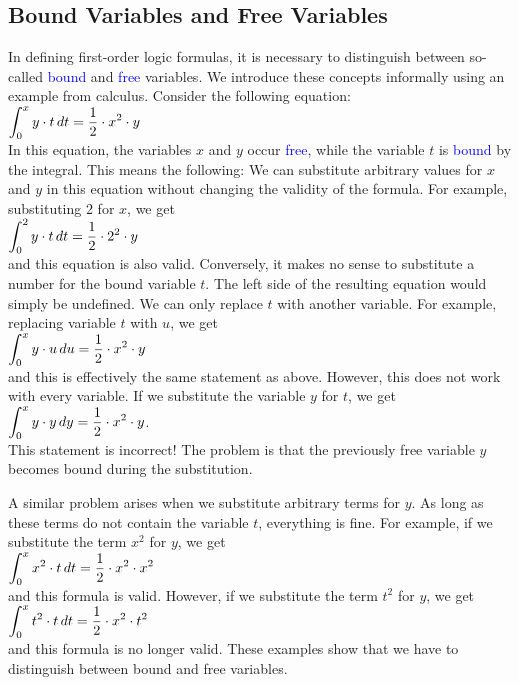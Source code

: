 \subsection{Bound Variables and Free Variables}
In defining first-order logic formulas, it is necessary
to distinguish between so-called \textcolor{blue}{bound} and \textcolor{blue}{free}
variables.
We introduce these concepts informally using an example from calculus.
Consider the following equation: \\[0.2cm]
\hspace*{1.3cm}
$\displaystyle\int_{0}^{x} y \cdot t\, dt = \frac{1}{2} \cdot x^2 \cdot y$
\\[0.2cm]
In this equation, the variables $x$ and $y$ occur \textcolor{blue}{free}, while the variable $t$ is \textcolor{blue}{bound} by the integral.
This means the following: We can substitute arbitrary values for $x$ and $y$ in this equation without
changing the validity of the formula. For example, substituting $2$ for $x$, we get \\[0.2cm]
\hspace*{1.3cm}
$\displaystyle\int_{0}^{2} y \cdot t\, dt = \frac{1}{2} \cdot 2^2 \cdot y$ \\[0.2cm]
and this equation is also valid. Conversely, it makes no sense to substitute a number for the bound variable
$t$.
The left side of the resulting equation would simply be undefined. We can only replace $t$
with another variable.
For example, replacing variable $t$ with $u$, we get \\[0.2cm]
\hspace*{1.3cm}
$\displaystyle\int_{0}^{x} y \cdot u\, du = \frac{1}{2} \cdot x^2 \cdot y$
\\[0.2cm]
and this is effectively the same statement as above. However, this does not work with every variable. If we
substitute the variable $y$ for $t$, we get \\[0.2cm]
\hspace*{1.3cm}
$\displaystyle\int_{0}^{x} y \cdot y\, dy = \frac{1}{2} \cdot x^2 \cdot y$. \\[0.2cm]
This statement is incorrect! The problem is that the previously free variable
$y$ becomes bound during the substitution.

A similar problem arises when we substitute arbitrary terms for $y$. As long as these terms do not contain the variable $t$,
everything is fine. For example, if we substitute the term $x^2$ for $y$, we get \\[0.2cm]
\hspace*{1.3cm}
$\displaystyle\int_{0}^{x} x^2 \cdot t\, dt = \frac{1}{2} \cdot x^2 \cdot x^2$
\\[0.2cm]
and this formula is valid. However, if we substitute the term $t^2$ for $y$, we get \\[0.2cm]
\hspace*{1.3cm}
$\displaystyle\int_{0}^{x} t^2 \cdot t\, dt = \frac{1}{2} \cdot x^2 \cdot t^2$
\\[0.2cm]
and this formula is no longer valid.  These examples show that we have to distinguish between bound and free
variables. 

